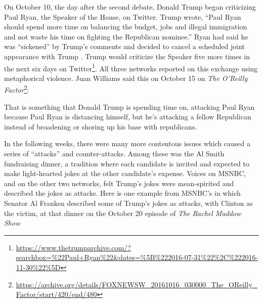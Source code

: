 


On October 10, the day after the second debate, Donald Trump began criticizing Paul 
Ryan, the Speaker of the House, on Twitter. Trump 
wrote, ``Paul Ryan should spend more time on balancing the budget, jobs and 
illegal immigration and not waste his time on fighting the Republican nominee.''
Ryan had said he was ``sickened'' by Trump's comments and decided to cancel a
scheduled joint appearance with Trump \cite{Fahrentold2016}.
Trump would criticize the Speaker five more times in
the next six days on Twitter\footnote{\url{https://www.thetrumparchive.com/?searchbox=%22Paul+Ryan%22&dates=%5B%222016-07-31%22%2C%222016-11-30%22%5D}}.
All three networks reported on this exchange using metaphorical
violence. Juan Williams said this on October 15 on \emph{The O'Reilly Factor}\footnote{\url{https://archive.org/details/FOXNEWSW_20161016_030000_The_OReilly_Factor/start/420/end/480}}:

\begin{exe}
  \ex That is something that Donald Trump is spending time on, attacking Paul
  Ryan because Paul Ryan is distancing himself, but he's attacking a fellow
  Republican instead of broadening or shoring up his base with republicans.
\end{exe}
In the following weeks, there were many more contentous issues which caused a
series of ``attacks'' and counter-attacks. Among these was the Al Smith 
fundraising dinner, a tradition where each candidate is invited and expected
to make light-hearted jokes at the other candidate's expense. 
Voices on MSNBC, and on the other two networks, felt
Trump's jokes were mean-spirited and described the jokes as attacks.
Here is one example from MSNBC's in which 
Senator Al Franken described some of Trump's jokes as attacks, 
with Clinton as the victim, at that dinner on the October 20 episode of
\emph{The Rachel Maddow Show}

